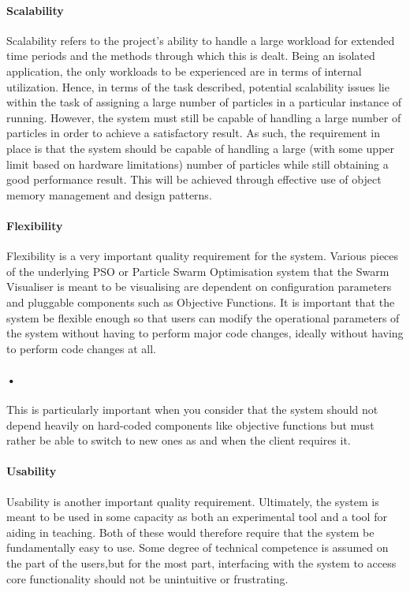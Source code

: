 \documentclass[11pt]{article}
\begin{document}
\paragraph{Scalability}
Scalability refers to the project's ability to handle a large workload for extended time periods and the methods through which this is dealt. Being an isolated application, the only workloads to be experienced are in terms of internal utilization. Hence, in terms of the task described, potential scalability issues lie within the task of assigning a large number of particles in a particular instance of running. 
\newline However, the system must still be capable of handling a large number of particles in order to achieve a satisfactory result. As such, the requirement in place is that the system should be capable of handling a large (with some upper limit based on hardware limitations) number of particles while still obtaining a good performance result. This will be achieved through effective use of object memory management and design patterns.

\paragraph{Flexibility}
Flexibility is a very important quality requirement for the system. Various pieces of the underlying PSO or Particle Swarm Optimisation system that the Swarm Visualiser is meant to be visualising are dependent on configuration parameters and pluggable components such as Objective Functions. It is important that the system be flexible enough so that users can modify the operational parameters of the system without having to perform major code changes, ideally without having to perform code changes at all.
\paragraph{•}
This is particularly important when you consider that the system should not depend heavily on hard-coded components like objective functions but must rather be able to switch to new ones as and when the client requires it.

\paragraph{Usability}
Usability is another important quality requirement. Ultimately, the system is meant to be used in some capacity as both an experimental tool and a tool for aiding in teaching. Both of these would therefore require that the system be fundamentally easy to use. Some degree of technical competence is assumed on the part of the users,but for the most part, interfacing with the system to access core functionality should not be unintuitive or frustrating. 
\end{document}
